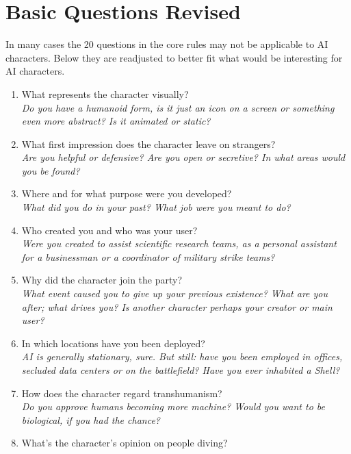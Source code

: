 \documentclass[12pt,a4paper,openany]{book}
\begin{document}
	\section{Basic Questions Revised}
	In many cases the 20 questions in the core rules may not be applicable to AI characters. Below they are readjusted to better fit what would be interesting for AI characters.
	\begin{multicols}{2}
	\begin{enumerate}
		\setlength\itemsep{-6mm}
		\item What represents the character visually?\\
		\textit{Do you have a humanoid form, is it just an icon on a screen or something even more abstract? Is it animated or static?}
		\item What first impression does the character leave on strangers?\\
		\textit{Are you helpful or defensive? Are you open or secretive? In what areas would you be found?}
		\item Where and for what purpose were you developed?\\
		\textit{What did you do in your past? What job were you meant to do?}
		\item Who created you and who was your user?\\
		\textit{Were you created to assist scientific research teams, as a personal assistant for a businessman or a coordinator of military strike teams?}
		\item Why did the character join the party?\\
		\textit{What event caused you to give up your previous existence? What are you after; what drives you? Is another character perhaps your creator or main user?}
		\item In which locations have you been deployed?\\
		\textit{AI is generally stationary, sure. But still: have you been employed in offices, secluded data centers or on the battlefield? Have you ever inhabited a Shell?}
		\item How does the character regard transhumanism?\\
		\textit{Do you approve humans becoming more machine? Would you want to be biological, if you had the chance?}
		\item What’s the character’s opinion on people diving?\\

\end{enumerate}
\end{multicols}
\end{document}
